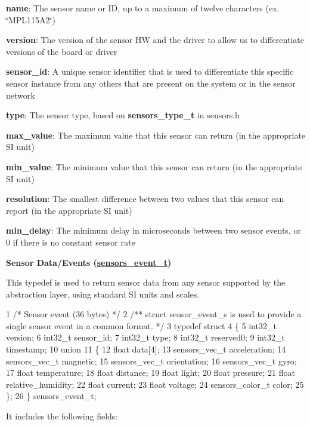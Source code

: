 \begin{DoxyItemize}
\item {\bfseries name}\+: The sensor name or ID, up to a maximum of twelve characters (ex. \char`\"{}\+M\+P\+L115\+A2\char`\"{})
\item {\bfseries version}\+: The version of the sensor HW and the driver to allow us to differentiate versions of the board or driver
\item {\bfseries sensor\+\_\+id}\+: A unique sensor identifier that is used to differentiate this specific sensor instance from any others that are present on the system or in the sensor network
\item {\bfseries type}\+: The sensor type, based on {\bfseries sensors\+\_\+type\+\_\+t} in sensors.\+h
\item {\bfseries max\+\_\+value}\+: The maximum value that this sensor can return (in the appropriate SI unit)
\item {\bfseries min\+\_\+value}\+: The minimum value that this sensor can return (in the appropriate SI unit)
\item {\bfseries resolution}\+: The smallest difference between two values that this sensor can report (in the appropriate SI unit)
\item {\bfseries min\+\_\+delay}\+: The minimum delay in microseconds between two sensor events, or \textquotesingle{}0\textquotesingle{} if there is no constant sensor rate
\end{DoxyItemize}

{\bfseries Sensor Data/\+Events (\hyperlink{_adafruit___sensor_8h_structsensors__event__t}{sensors\+\_\+event\+\_\+t})}

This typedef is used to return sensor data from any sensor supported by the abstraction layer, using standard SI units and scales.


\begin{DoxyCode}
1 /* Sensor event (36 bytes) */
2 /** struct sensor\_event\_s is used to provide a single sensor event in a common format. */
3 typedef struct
4 \{
5     int32\_t version;
6     int32\_t sensor\_id;
7     int32\_t type;
8     int32\_t reserved0;
9     int32\_t timestamp;
10     union
11     \{
12         float           data[4];
13         sensors\_vec\_t   acceleration;
14         sensors\_vec\_t   magnetic;
15         sensors\_vec\_t   orientation;
16         sensors\_vec\_t   gyro;
17         float           temperature;
18         float           distance;
19         float           light;
20         float           pressure;
21         float           relative\_humidity;
22         float           current;
23         float           voltage;
24         sensors\_color\_t color;
25     \};
26 \} sensors\_event\_t;
\end{DoxyCode}
 It includes the following fields\+:


